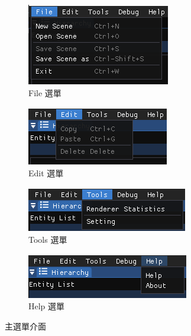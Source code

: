 \begin{figure}[h]
    \begin{subfigure}[b]{0.5\linewidth}
        \includegraphics[width=\linewidth]{./resources/editor/a.png} 
        \caption{File 選單}
    \end{subfigure}
    \begin{subfigure}[b]{0.5\linewidth}
        \includegraphics[width=\linewidth]{./resources/editor/b.png}
        \caption{Edit 選單}
    \end{subfigure}
    \begin{subfigure}[b]{0.5\linewidth}
        \includegraphics[width=\linewidth]{./resources/editor/c.png}
        \caption{Tools 選單}
    \end{subfigure}
    \begin{subfigure}[b]{0.5\linewidth}
        \includegraphics[width=\linewidth]{./resources/editor/d.png}
        \caption{Help 選單}
    \end{subfigure}
\caption{主選單介面}
\label{fig:MenuBar}
\end{figure}

